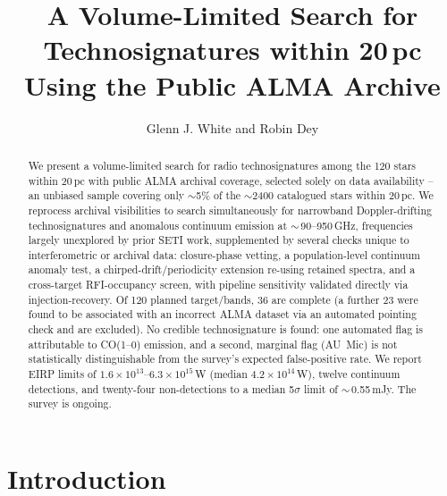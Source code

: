 \documentclass{openjournal}
\begin{document}
\title{A Volume-Limited Search for Technosignatures within 20\,pc Using the Public ALMA Archive}

\author{Glenn J. White and Robin Dey}

\begin{abstract}
We present a volume-limited search for radio technosignatures among the
120 stars within 20\,pc with public ALMA archival coverage, selected
solely on data availability -- an unbiased sample covering only
$\sim$5\% of the $\sim$2400 catalogued stars within 20\,pc. We reprocess
archival visibilities to search simultaneously for narrowband
Doppler-drifting technosignatures and anomalous continuum emission at
$\sim$\,90--950\,GHz, frequencies largely unexplored by prior SETI work,
supplemented by several checks unique to interferometric or archival
data: closure-phase vetting, a population-level continuum anomaly test,
a chirped-drift/periodicity extension re-using retained spectra, and a
cross-target RFI-occupancy screen, with pipeline sensitivity validated
directly via injection-recovery. Of 120 planned target/bands, 36 are
complete (a further 23 were found to be associated with an incorrect
ALMA dataset via an automated pointing check and are excluded). No
credible technosignature is found: one automated flag is attributable to
CO(1--0) emission, and a second, marginal flag (AU~Mic) is not
statistically distinguishable from the survey's expected false-positive
rate. We report EIRP limits of
$1.6\times10^{13}$--$6.3\times10^{15}$\,W (median $4.2\times10^{14}$\,W),
twelve continuum detections, and twenty-four non-detections to a median
5$\sigma$ limit of $\sim$\,0.55\,mJy. The survey is ongoing.
\end{abstract}


\section{Introduction}
\label{sec:intro}
\end{document}
